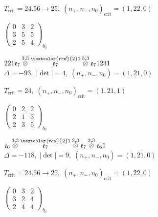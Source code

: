 \documentclass[10pt]{article}
\begin{document}
\hspace{1em}$T_{\text{crit}}=24.56 \to 25,\; (n_+,n_-,n_0)_{\text{crit}}=(1,22,0)$

\hspace{2em}$\left(\begin{smallmatrix}0 & 3 & 2 \\ 3 & 5 & 5 \\ 2 & 5 & 4\end{smallmatrix}\right)_{\!b_0}$

\smallskip

$221\mathfrak{e}_7\overset{3,3}{\otimes}\overset{\textcolor{red}{2}1}{\mathfrak{e}_7}\overset{3,3}{\otimes}\mathfrak{e}_71231$ \quad $\Delta=-93,\; |\det|=4,\; (n_+,n_-,n_0)=(1,21,0)$

\hspace{1em}$T_{\text{crit}}=24,\; (n_+,n_-,n_0)_{\text{crit}}=(1,21,1)$

\hspace{2em}$\left(\begin{smallmatrix}0 & 2 & 2 \\ 2 & 1 & 3 \\ 2 & 3 & 5\end{smallmatrix}\right)_{\!b_0}$

\smallskip

$\mathfrak{e}_6\overset{3,3}{\otimes}\overset{\textcolor{red}{2}1}{\mathfrak{e}_7}\overset{3,3}{\otimes}\mathfrak{e}_7\overset{3,3}{\otimes}\mathfrak{e}_61$ \quad $\Delta=-118,\; |\det|=9,\; (n_+,n_-,n_0)=(1,21,0)$

\hspace{1em}$T_{\text{crit}}=24.56 \to 25,\; (n_+,n_-,n_0)_{\text{crit}}=(1,22,0)$

\hspace{2em}$\left(\begin{smallmatrix}0 & 3 & 2 \\ 3 & 2 & 4 \\ 2 & 4 & 4\end{smallmatrix}\right)_{\!b_0}$

\smallskip
\end{document}

